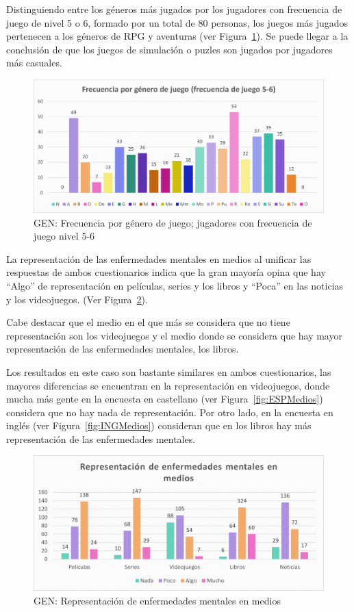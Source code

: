 \documentclass[12pt, a4paper,twoside,titlepage]{book}
\begin{document}
 Distinguiendo entre los géneros más jugados por los jugadores con frecuencia de juego de nivel 5 o 6, formado por un total de 80 personas, los juegos más jugados pertenecen a los géneros de RPG y aventuras (ver Figura~\ref{fig:Frecgen56}). Se puede llegar a la conclusión de que los juegos de simulación o puzles son jugados por jugadores más casuales. 
 
 \begin{figure}
\centering
 \includegraphics[width=.8\linewidth]{ANEXO Gen/8AnexGENFrecgen56}
 \caption{GEN: Frecuencia por género de juego; jugadores con frecuencia de juego nivel 5-6}
 \label{fig:Frecgen56}
 \end{figure}
 
 
La representación de las enfermedades mentales en medios al unificar las respuestas de ambos cuestionarios indica que la gran mayoría opina que hay “Algo” de representación en películas, series y los libros y “Poca” en las noticias y los videojuegos. (Ver Figura~\ref{fig:Medios}). 

Cabe destacar que el medio en el que más se considera que no tiene representación son los videojuegos y el medio donde se considera que hay mayor representación de las enfermedades mentales, los libros. 

Los resultados en este caso son bastante similares en ambos cuestionarios, las mayores diferencias se encuentran en la representación en videojuegos, donde mucha más gente en la encuesta en castellano (ver Figura~\ref{fig:ESPMedios}) considera que no hay nada de representación. Por otro lado, en la encuesta en inglés (ver Figura~\ref{fig:INGMedios}) consideran que en los libros hay más representación de las enfermedades mentales. 


\begin{figure}
\centering
 \includegraphics[width=.9\linewidth]{Imagenes Form GEN/5GENMedio}
 \caption{GEN: Representación de enfermedades mentales en medios}
 \label{fig:Medios}
 \end{figure}
\end{document}
